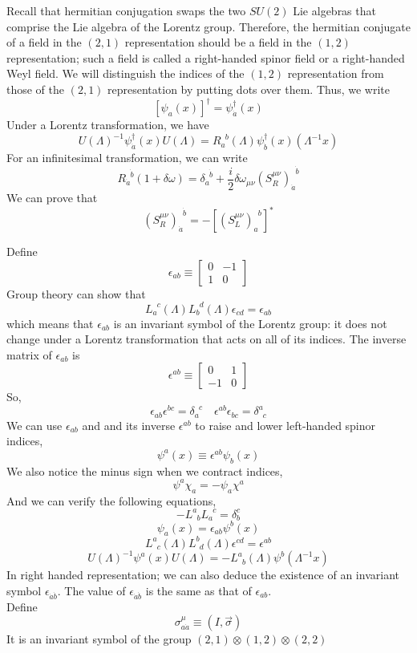 Recall that hermitian conjugation swaps the two $SU(2)$ Lie
algebras that comprise the Lie algebra of the Lorentz group.
Therefore, the hermitian conjugate of a field in the $(2,1)$ representation should be a field in the $(1,2)$ representation; such a field is called a right-handed spinor field or a right-handed Weyl field. We will distinguish the indices of the $(1,2)$ representation from those of the $(2,1)$ representation by putting dots over them. Thus, we write
\[[\psi_a(x)]^{\dagger} = \psi^{\dagger}_{\dot{a}}(x)\]
Under a Lorentz transformation, we have
\[U(\Lambda)^{-1} \psi^{\dagger}_{\dot{a}}(x) U(\Lambda) = R_a^{\phantom{a}b}(\Lambda) \psi^{\dagger}_{\dot{b}}(x)(\Lambda^{-1}x)\]
For an infinitesimal transformation, we can write
\[R_{\dot{a}}^{\phantom{a}\dot{b}}(1+\delta \omega) = \delta_{\dot{a}}^{\phantom{a}\dot{b}} + \frac{i}{2} \delta \omega_{\mu \nu} (S_R^{\mu \nu})_{\dot{a}}^{\phantom{a}\dot{b}}\]
We can prove that
\[(S_R^{\mu \nu})_{\dot{a}}^{\phantom{a}\dot{b}} = -[(S_L^{\mu \nu})_a^{\phantom{a}b}]^*\]

\noindent
Define
\[\epsilon_{ab} \equiv \left[ \begin{matrix} 0& -1\\ 1& 0\end{matrix} \right] \]
Group theory can show that
\[L_a^{\phantom{a}c}(\Lambda) L_b^{\phantom{b}d}(\Lambda) \epsilon_{cd} = \epsilon
_{ab}\]
which means that $\epsilon_{ab}$ is an invariant symbol of the Lorentz group: it does not change under a Lorentz transformation that acts on all of its indices. The inverse matrix of $\epsilon_{ab}$ is
\[\epsilon^{ab} \equiv \left[ \begin{matrix} 0& 1\\ -1& 0\end{matrix} \right] \]
So,
\[\epsilon_{ab}\epsilon^{bc} = \delta_a^{\phantom{a}c} \quad \epsilon^{ab}\epsilon_{bc} = \delta^a_{\phantom{a}c}\]
We can use $\epsilon_{ab}$ and and its inverse $\epsilon^{ab}$ to raise and lower left-handed spinor indices, 
\[\psi^a(x) \equiv \epsilon^{ab} \psi_b(x)\]
We also notice the minus sign when we contract indices,
\[\psi^a \chi_a = -\psi_a \chi^a\]
And we can verify the following equations,
\[-L^a_{\phantom{a}b} L_a^{\phantom{a}c} = \delta^c_b \]
\[\psi_a(x) = \epsilon_{ab} \psi^b(x)\]
\[L^a_{\phantom{a}c}(\Lambda) L^b_{\phantom{b}d}(\Lambda) \epsilon^{cd} = \epsilon
^{ab}\]
\[U(\Lambda)^{-1} \psi^a(x) U(\Lambda) = -L^a_{\phantom{a}b}(\Lambda) \psi^b(\Lambda^{-1}x)\]
In right handed representation; we can also deduce the existence of an invariant symbol $\epsilon_{\dot{a}\dot{b}}$. The value of $\epsilon_{\dot{a}\dot{b}}$ is the same as that of $\epsilon_{ab}$.\\
Define
\[\sigma^{\mu}_{a\dot{a}} \equiv (I,\vec{\sigma})\]
It is an invariant symbol of the group $(2,1) \otimes (1,2) \otimes (2,2)$

